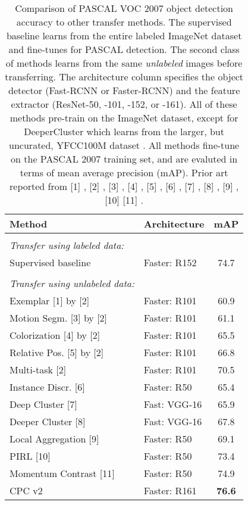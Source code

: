 \documentclass{article}
\begin{document}
\begin{table}[t]
\caption{Comparison of PASCAL VOC 2007 object detection accuracy to other transfer methods. The supervised baseline learns from the entire labeled ImageNet dataset and fine-tunes for PASCAL detection. The second class of methods learns from the same \emph{unlabeled} images before transferring. The architecture column specifies the object detector (Fast-RCNN or Faster-RCNN) and the feature extractor (ResNet-50, -101, -152, or -161). All of these methods pre-train on the ImageNet dataset, except for DeeperCluster which learns from the larger, but uncurated, YFCC100M dataset \citep{thomee2015yfcc100m}. All methods fine-tune on the PASCAL 2007 training set, and are evaluted in terms of mean average precision (mAP). Prior art reported from [1] \citet{dosovitskiy2014discriminative}, [2] \citet{doersch2017multi}, [3] \citet{pathak2016learning},  [4] \citet{zhang2016colorful},  [5] \citet{doersch2015unsupervised},  [6] \citet{wu2018unsupervised}, [7] \citet{caron2018deep}, [8] \citet{caron2019leveraging}, [9] \citet{zhuang2019local}, [10] \citet{misra2019pirl} [11] \citet{he2019momentum}.} 
\label{tab:pascal_det}
\begin{center}
\begin{small}
\begin{sc}
\begin{tabular}{l l c}
\toprule
Method  & Architecture & mAP \\ 
\midrule \\
    \textit{Transfer using labeled data:} & & \\
    Supervised baseline & Faster: R152 & 74.7 \\
    \midrule \\
    \textit{Transfer using unlabeled data:} & \\
    Exemplar [1] \small{by} [2] & Faster: R101 & 60.9  \\
    Motion Segm. [3] \small{by} [2] & Faster: R101 & 61.1  \\
    Colorization [4] \small{by} [2] & Faster: R101 & 65.5 \\
    Relative Pos. [5] \small{by} [2]   & Faster: R101 & 66.8 \\ 
    Multi-task [2] & Faster: R101 & 70.5  \\
    Instance Discr. [6] & Faster: R50 & 65.4 \\ 
    Deep Cluster [7] & Fast: VGG-16 & 65.9 \\
    Deeper Cluster [8] & Fast: VGG-16 & 67.8  \\
    Local Aggregation [9] & Faster: R50 & 69.1 \\ 
    PIRL [10] & Faster: R50 &  73.4 \\ 
    Momentum Contrast [11] & Faster: R50 & 74.9 \\ 
    \midrule
    CPC v2 & Faster: R161 & \textbf{76.6} \\
    \bottomrule
\end{tabular}
\end{sc}
\end{small}
\end{center}
\end{table} 
\end{document}
